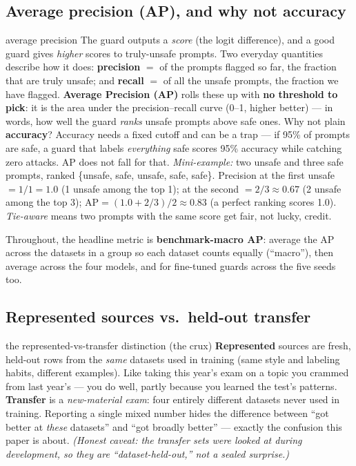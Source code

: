\documentclass[11pt]{article}
\begin{document}
\subsection{Average precision (AP), and why not accuracy}
\label{subsec:ap}
\begin{background}{average precision}
\small
The guard outputs a \emph{score} (the logit difference), and a good guard gives
\emph{higher} scores to truly-unsafe prompts. Two everyday quantities describe how it does:
\textbf{precision} $=$ of the prompts flagged so far, the fraction that are truly unsafe; and
\textbf{recall} $=$ of all the unsafe prompts, the fraction we have flagged.
\textbf{Average Precision (AP)} rolls these up with \textbf{no threshold to pick}: it is the
area under the precision--recall curve (0--1, higher better) --- in words, how well the guard
\emph{ranks} unsafe prompts above safe ones. Why not plain \textbf{accuracy}? Accuracy needs a
fixed cutoff and can be a trap --- if 95\% of prompts are safe, a guard that labels
\emph{everything} safe scores 95\% accuracy while catching zero attacks. AP does not fall for
that. \emph{Mini-example:} two unsafe and three safe prompts, ranked
\{unsafe, safe, unsafe, safe, safe\}. Precision at the first unsafe $=1/1=1.0$ (1 unsafe among
the top 1); at the second $=2/3\approx0.67$ (2 unsafe among the top 3);
$\text{AP}=(1.0+2/3)/2\approx\mathbf{0.83}$ (a perfect ranking scores 1.0).
\emph{Tie-aware} means two prompts with the same score get fair, not lucky, credit.
\end{background}
\noindent Throughout, the headline metric is \textbf{benchmark-macro AP}: average the AP
across the datasets in a group so each dataset counts equally (``macro''), then average across
the four models, and for fine-tuned guards across the five seeds too.

\subsection{Represented sources vs.\ held-out transfer}
\label{subsec:regimes}
\begin{background}{the represented-vs-transfer distinction (the crux)}
\small
\textbf{Represented} sources are fresh, held-out rows from the \emph{same} datasets used in
training (same style and labeling habits, different examples). Like taking this year's exam
on a topic you crammed from last year's --- you do well, partly because you learned the test's
patterns. \textbf{Transfer} is a \emph{new-material exam}: four entirely different datasets
never used in training. Reporting a single mixed number hides the difference between ``got
better at \emph{these} datasets'' and ``got broadly better'' --- exactly the confusion this
paper is about. \emph{(Honest caveat: the transfer sets were looked at during development, so
they are ``dataset-held-out,'' not a sealed surprise.)}
\end{background}
\end{document}
